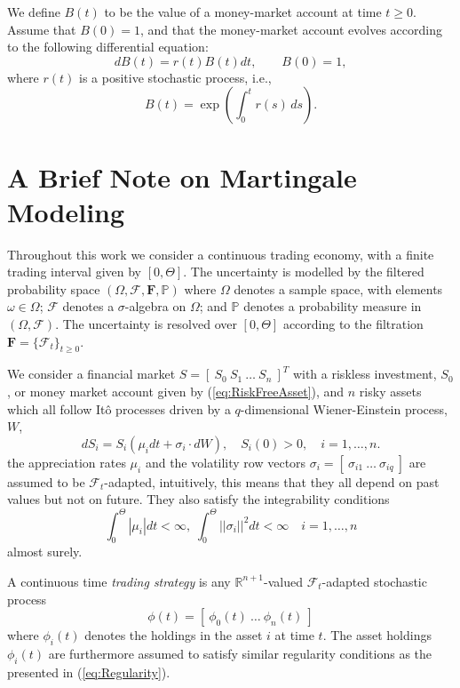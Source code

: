 \begin{defn} We define $B(t)$ to be the value
  of a money-market account at time $t\geq 0$. Assume that $B(0)=1$,
  and that the money-market account evolves according to the following
  differential equation: 
\begin{equation}
\label{eq:RiskFreeAsset}
dB(t)=r(t) B(t) dt,\qquad B(0)=1,
\end{equation}
where $r(t)$ is a positive stochastic process, i.e.,
\begin{equation}
\label{eq:DepofunctioninstaShortRate}
B(t)=\exp\left( \int_0^t r(s)\, ds\right).
\end{equation}
\end{defn}

\section{A Brief Note on Martingale Modeling}
Throughout this work we consider a continuous trading economy, with a
finite trading interval given by $[0,\Theta]$. The uncertainty is
modelled by the filtered probability space $(\Omega, \mathcal{F},
\mathbf{F}, \mathbb{P})$ where $\Omega$ denotes a sample space, with elements
$\omega\in\Omega$; $\mathcal{F}$ denotes a $\sigma$-algebra on
$\Omega$; and $\mathbb{P}$ denotes a probability measure in $(\Omega,
\mathcal{F})$. The uncertainty is resolved over $[0, \Theta]$
according to the filtration $\mathbf{F}=\{\mathcal{F}_t \}_{t \geq
  0}$. 

We consider a financial market $S=[~S_0~S_1~\dots~S_n~]^T$ with a
riskless investment, $S_0$, or money market account given by
(\ref{eq:RiskFreeAsset}), and $n$ risky assets which all follow It\^o
processes driven by a $q$-dimensional Wiener-Einstein process, $W$,
$$ 
dS_i=S_i( \mu_i dt + \sigma_i \cdot dW),\quad S_i(0)>0,\quad i=1,\dots,n.
$$
the appreciation rates $\mu_i$ and the volatility row vectors
$\sigma_i=[~\sigma_{i1}~\dots~\sigma_{iq}~]$ are assumed to be 
$\mathcal{F}_t$-adapted, intuitively, this means that they all depend on
past values but not on future. They also satisfy the integrability
conditions 
\begin{equation}
\label{eq:Regularity}
\int_0^\Theta |\mu_i| dt<\infty,\; \int_0^\Theta ||\sigma_i||^2
dt<\infty \quad i=1,\dots,n 
\end{equation}
almost surely.

A continuous time {\sl trading strategy} is any $\mathbb{R}^{n+1}$-valued
$\mathcal{F}_t$-adapted stochastic process 
$$
\phi(t)=[~\phi_0(t)~\dots~\phi_n(t)~]
$$
where $\phi_i(t)$ denotes the holdings in the asset $i$ at time
$t$. The asset holdings $\phi_i(t)$ are furthermore assumed to satisfy
similar regularity conditions as the presented in 
(\ref{eq:Regularity}).

